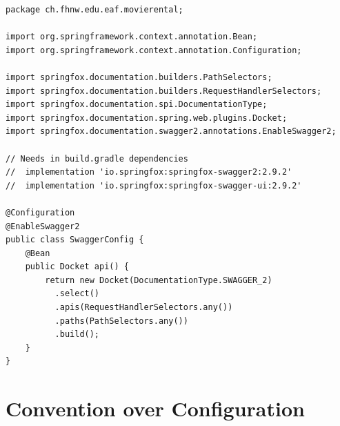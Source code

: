 \documentclass[a4paper,10pt]{scrreprt}
\begin{document}
\begin{lstlisting}[caption=SwaggerConfig.java]
package ch.fhnw.edu.eaf.movierental;

import org.springframework.context.annotation.Bean;
import org.springframework.context.annotation.Configuration;

import springfox.documentation.builders.PathSelectors;
import springfox.documentation.builders.RequestHandlerSelectors;
import springfox.documentation.spi.DocumentationType;
import springfox.documentation.spring.web.plugins.Docket;
import springfox.documentation.swagger2.annotations.EnableSwagger2;

// Needs in build.gradle dependencies
//  implementation 'io.springfox:springfox-swagger2:2.9.2'
//  implementation 'io.springfox:springfox-swagger-ui:2.9.2'

@Configuration
@EnableSwagger2
public class SwaggerConfig {                                    
    @Bean
    public Docket api() { 
        return new Docket(DocumentationType.SWAGGER_2)  
          .select()                                  
          .apis(RequestHandlerSelectors.any())              
          .paths(PathSelectors.any())                          
          .build();                                           
    }
}
\end{lstlisting}
\chapter{Convention over Configuration}
\end{document}
